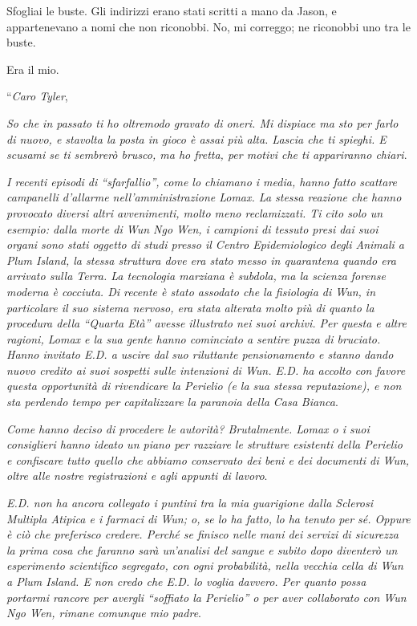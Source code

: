 Sfogliai le buste. Gli indirizzi erano stati scritti a mano da Jason, e
appartenevano a nomi che non riconobbi. No, mi correggo; ne riconobbi
uno tra le buste.

Era il mio.

``\emph{Caro Tyler},

\emph{So che in passato ti ho oltremodo gravato di oneri. Mi dispiace ma
	sto per farlo di nuovo, e stavolta la posta in gioco è assai più alta.
	Lascia che ti spieghi. E scusami se ti sembrerò brusco, ma ho fretta,
	per motivi che ti appariranno chiari}.

\emph{I recenti episodi di ``sfarfallio'', come lo chiamano i media,
	hanno fatto scattare campanelli d'allarme nell'amministrazione Lomax. La
	stessa reazione che hanno provocato diversi altri avvenimenti, molto
	meno reclamizzati. Ti cito solo un esempio: dalla morte di Wun Ngo Wen,
	i campioni di tessuto presi dai suoi organi sono stati oggetto di studi
	presso il Centro Epidemiologico degli Animali a Plum Island, la stessa
	struttura dove era stato messo in quarantena quando era arrivato sulla
	Terra. La tecnologia marziana è subdola, ma la scienza forense moderna è
	cocciuta. Di recente è stato assodato che la fisiologia di Wun, in
	particolare il suo sistema nervoso, era stata alterata molto più di
	quanto la procedura della ``Quarta Età'' avesse illustrato nei suoi
	archivi. Per questa e altre ragioni, Lomax e la sua gente hanno
	cominciato a sentire puzza di bruciato. Hanno invitato E.D. a uscire dal
	suo riluttante pensionamento e stanno dando nuovo credito ai suoi
	sospetti sulle intenzioni di Wun. E.D. ha accolto con favore questa
	opportunità di rivendicare la Perielio (e la sua stessa reputazione), e
	non sta perdendo tempo per capitalizzare la paranoia della Casa Bianca}.

\emph{Come hanno deciso di procedere le autorità? Brutalmente. Lomax o i
	suoi consiglieri hanno ideato un piano per razziare le strutture
	esistenti della Perielio e confiscare tutto quello che abbiamo
	conservato dei beni e dei documenti di Wun, oltre alle nostre
	registrazioni e agli appunti di lavoro}.

\emph{E.D. non ha ancora collegato i puntini tra la mia guarigione dalla
	Sclerosi Multipla Atipica e i farmaci di Wun; o, se lo ha fatto, lo ha
	tenuto per sé. Oppure è ciò che preferisco credere. Perché se finisco
	nelle mani dei servizi di sicurezza la prima cosa che faranno sarà
	un'analisi del sangue e subito dopo diventerò un esperimento scientifico
	segregato, con ogni probabilità, nella vecchia cella di Wun a Plum
	Island. E non credo che E.D. lo voglia davvero. Per quanto possa
	portarmi rancore per avergli ``soffiato la Perielio'' o per aver
	collaborato con Wun Ngo Wen, rimane comunque mio padre}.

